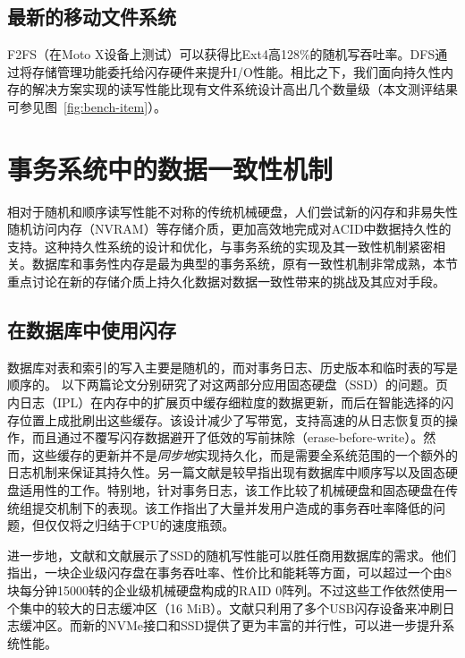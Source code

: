 \subsection{最新的移动文件系统}
F2FS\cite{188454}（在Moto X设备上测试）可以获得比Ext4\cite{MOTOX:2013}高128\%的随机写吞吐率。DFS\cite{Josephson:2010:DFS:1855511.1855518}通过将存储管理功能委托给闪存硬件来提升I/O性能。相比之下，我们面向持久性内存的解决方案实现的读写性能比现有文件系统设计高出几个数量级（本文测评结果可参见图~\ref{fig:bench-item}）。

\section{事务系统中的数据一致性机制}

相对于随机和顺序读写性能不对称的传统机械硬盘，人们尝试新的闪存和非易失性随机访问内存（NVRAM）等存储介质，更加高效地完成对ACID中数据持久性的支持。这种持久性系统的设计和优化，与事务系统的实现及其一致性机制紧密相关。数据库和事务性内存是最为典型的事务系统，原有一致性机制非常成熟，本节重点讨论在新的存储介质上持久化数据对数据一致性带来的挑战及其应对手段。

\subsection{在数据库中使用闪存}

数据库对表和索引的写入主要是随机的，而对事务日志、历史版本和临时表的写是顺序的。
以下两篇论文分别研究了对这两部分应用固态硬盘（SSD）的问题。页内日志（IPL）\cite{Lee:2007:DFD:1247480.1247488}在内存中的扩展页中缓存细粒度的数据更新，而后在智能选择的闪存位置上成批刷出这些缓存。该设计减少了写带宽，支持高速的从日志恢复页的操作，而且通过不覆写闪存数据避开了低效的写前抹除（erase-before-write）。然而，这些缓存的更新并不是\emph{同步地}实现持久化，而是需要全系统范围的一个额外的日志机制来保证其持久性。另一篇文献\cite{Lee:2008:CFM:1376616.1376723}是较早指出现有数据库中顺序写以及固态硬盘适用性的工作。特别地，针对事务日志，该工作比较了机械硬盘和固态硬盘在传统组提交机制下的表现。该工作指出了大量并发用户造成的事务吞吐率降低的问题，但仅仅将之归结于CPU的速度瓶颈。

进一步地，文献\cite{Lee:2009:AFM:1559845.1559937}和文献\cite{Chen:2009:FEF:1559845.1559855}展示了SSD的随机写性能可以胜任商用数据库的需求。他们指出，一块企业级闪存盘在事务吞吐率、性价比和能耗等方面，可以超过一个由8块每分钟15000转的企业级机械硬盘构成的RAID 0阵列。不过这些工作依然使用一个集中的较大的日志缓冲区（16 MiB）。文献\cite{Chen:2009:FEF:1559845.1559855}只利用了多个USB闪存设备来冲刷日志缓冲区。而新的NVMe接口和SSD提供了更为丰富的并行性，可以进一步提升系统性能。

